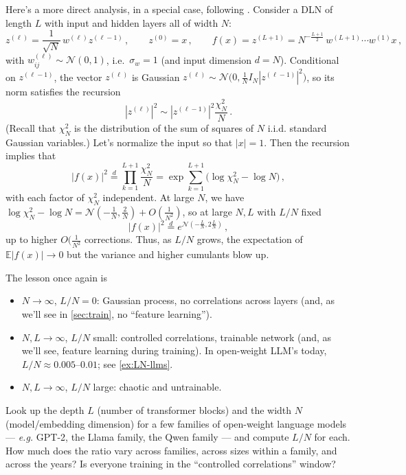 \documentclass[11pt]{article}
\newcommand{\E}{\mathbb{E}}
\newcommand{\CN}{{\mathcal N}}
\begin{document}
Here's a more direct analysis, in a special case, following \cite[Lecture 2]{hanin2026mdl}. 
Consider a DLN of length $L$ with input and hidden layers all of width $N$:
%
\begin{equation}
    z^{(\ell)} = \frac{1}{\sqrt N}\,w^{(\ell)}z^{(\ell-1)}\,,\qquad z^{(0)}=x\,,\qquad  f(x)=z^{(L+1)}=N^{-\frac{L+1}{2}}\,w^{(L+1)}\cdots w^{(1)}x\,,
\end{equation}
%
with $w_{ij}^{(\ell)}\sim \CN(0,1)$, i.e.\ $\sigma_w=1$ (and input dimension $d=N$).
Conditional on $z^{(\ell-1)}$, the vector $z^{(\ell)}$ is Gaussian $z^{(\ell)}\sim \CN\big(0,\frac{1}{N} I_N |z^{(\ell-1)}|^2\big)$, so its norm satisfies the recursion
%
\begin{equation}|z^{(\ell)}|^2 \sim |z^{(\ell-1)}|^2 \frac{\chi^2_N}{N}\,.
\end{equation}
%
(Recall that $\chi^2_N$ is the distribution of the sum of squares of $N$ i.i.d. standard Gaussian variables.)
Let's normalize the input so that $|x|=1$. Then the recursion implies that 
%
\begin{equation} |f(x)|^2  \overset{d}{=} \prod_{k=1}^{L+1} \frac{\chi^2_N}{N} = \exp\sum_{k=1}^{L+1} \big(\log \chi^2_N-\log N\big)\,,
\end{equation}
%
with each factor of $\chi^2_N$ independent. At large $N$, we have $\log \chi_N^2-\log N = \CN(-\frac{1}{N},\frac{2}{N})+O(\frac{1}{N^2})$, so at large $N,L$ with $L/N$ fixed
%
\begin{equation}
    |f(x)|^2 \overset{d}= e^{\textstyle \CN(-\frac{L}{N},2\frac{L}{N})}\,,
\end{equation}
%
up to higher $O(\frac{1}{N^2}$ corrections. Thus, as $L/N$ grows, the expectation of $\E|f(x)|\to 0$ but the variance and higher cumulants blow up.

The lesson once again is
\begin{itemize}
\item $N\to \infty$, $L/N=0$: Gaussian process, no correlations across layers (and, as we'll see in \cref{sec:train}, no ``feature learning'').
\item $N,L\to \infty$, $L/N$ small: controlled correlations, trainable network (and, as we'll see, feature learning during training). In open-weight LLM's today, $L/N\approx 0.005$--$0.01$; see \cref{ex:LN-llms}.
\item $N,L\to\infty$, $L/N$ large: chaotic and untrainable.
\end{itemize}

\begin{exercise}
\label{ex:LN-llms}
\important
Look up the depth $L$ (number of transformer blocks) and the width $N$ (model/embedding dimension) for a few families of open-weight language models --- \emph{e.g.} GPT-2, the Llama family, the Qwen family --- and compute $L/N$ for each. How much does the ratio vary across families, across sizes within a family, and across the years? Is everyone training in the ``controlled correlations'' window?
\end{exercise}
\end{document}
